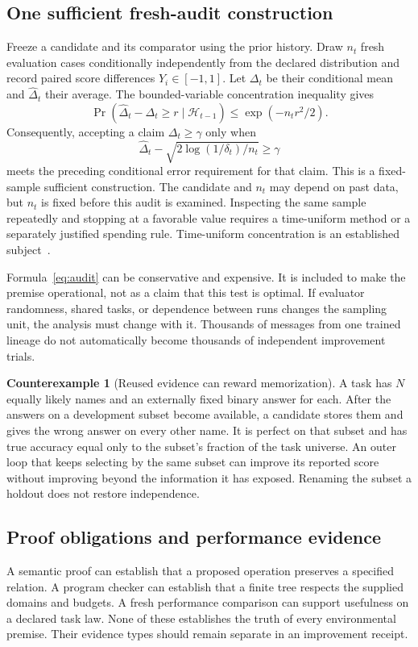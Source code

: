 \documentclass[11pt,letterpaper]{article}
\theoremstyle{plain}
\theoremstyle{definition}
\newtheorem{counterexample}[theorem]{Counterexample}
\begin{document}
\subsection{One sufficient fresh-audit construction}
Freeze a candidate and its comparator using the prior history. Draw $n_t$ fresh evaluation cases conditionally independently from the declared distribution and record paired score differences $Y_i\in[-1,1]$. Let $\Delta_t$ be their conditional mean and $\widehat\Delta_t$ their average. The bounded-variable concentration inequality gives
\[
\Pr\left(\widehat\Delta_t-\Delta_t\geq r\mid\mathcal H_{t-1}\right)
\leq \exp(-n_tr^2/2).
\]
Consequently, accepting a claim $\Delta_t\geq\gamma$ only when
\begin{equation}\label{eq:audit}
\widehat\Delta_t-\sqrt{2\log(1/\delta_t)/n_t}\geq\gamma
\end{equation}
meets the preceding conditional error requirement for that claim. This is a fixed-sample sufficient construction. The candidate and $n_t$ may depend on past data, but $n_t$ is fixed before this audit is examined. Inspecting the same sample repeatedly and stopping at a favorable value requires a time-uniform method or a separately justified spending rule. Time-uniform concentration is an established subject~\cite{howard}.

Formula~\eqref{eq:audit} can be conservative and expensive. It is included to make the premise operational, not as a claim that this test is optimal. If evaluator randomness, shared tasks, or dependence between runs changes the sampling unit, the analysis must change with it. Thousands of messages from one trained lineage do not automatically become thousands of independent improvement trials.

\begin{counterexample}[Reused evidence can reward memorization]\label{ex:reuse}
A task has $N$ equally likely names and an externally fixed binary answer for each. After the answers on a development subset become available, a candidate stores them and gives the wrong answer on every other name. It is perfect on that subset and has true accuracy equal only to the subset's fraction of the task universe. An outer loop that keeps selecting by the same subset can improve its reported score without improving beyond the information it has exposed. Renaming the subset a holdout does not restore independence.
\end{counterexample}

\subsection{Proof obligations and performance evidence}
A semantic proof can establish that a proposed operation preserves a specified relation. A program checker can establish that a finite tree respects the supplied domains and budgets. A fresh performance comparison can support usefulness on a declared task law. None of these establishes the truth of every environmental premise. Their evidence types should remain separate in an improvement receipt.
\end{document}
